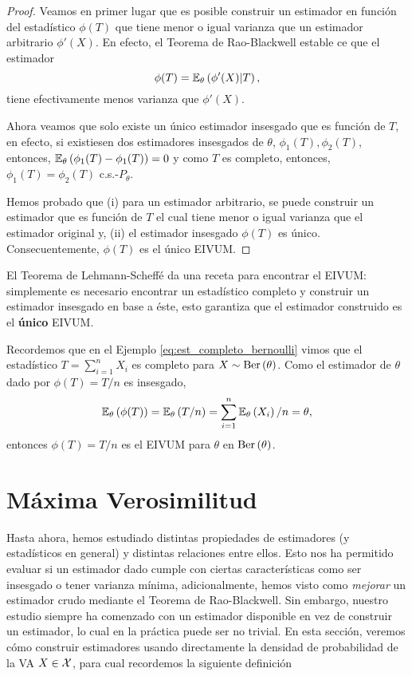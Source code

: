  \begin{proof}
 	Veamos en primer lugar que es posible construir un estimador en función del estadístico $\phi(T)$ que tiene menor o igual varianza que un estimador arbitrario $\phi'(X)$. En efecto, el Teorema de Rao-Blackwell estable ce que el estimador 
 	\begin{equation}
 		\phi(T) = \mathbb{E}_\theta \left(\phi'(X)|T\right),
 	\end{equation}
 	tiene efectivamente menos varianza que $\phi'(X)$.

 	Ahora veamos que solo existe un único estimador insesgado que es función de $T$, en efecto, si existiesen dos estimadores insesgados de $\theta$, $\phi_1(T),\phi_2(T)$, entonces, $\mathbb{E}_\theta \left(\phi_1(T)-\phi_1(T)\right)=0$ y como $T$ es completo, entonces, $\phi_1(T) = \phi_2(T)$ c.s.-$P_\theta$.

 	Hemos probado que (i) para un estimador arbitrario, se puede construir un estimador que es función de $T$ el cual tiene menor o igual varianza que el estimador original y, (ii) el estimador insesgado $\phi(T)$ es único. Consecuentemente, $\phi(T)$ es el único EIVUM.
 \end{proof}

El Teorema de Lehmann-Scheffé da una receta para encontrar el EIVUM: simplemente es necesario encontrar un estadístico completo y construir un estimador insesgado en base a éste, esto garantiza que el estimador construido es el \textbf{único} EIVUM.
\begin{example}
	Recordemos que en el Ejemplo \ref{eq:est_completo_bernoulli} vimos que el estadístico $T=\sum_{i=1}^nX_i$ es completo para $X\sim\text{Ber}\left(\theta\right)$. Como el estimador de $\theta$ dado por $\phi(T) = T/n$ es insesgado, 
\begin{equation}
	\mathbb{E}_\theta \left(\phi(T)\right) = \mathbb{E}_\theta \left(T/n\right) = \sum_{i=1}^n \mathbb{E}_\theta \left(X_i\right) /n = \theta,
\end{equation}
entonces $\phi(T) = T/n$ es el EIVUM para $\theta$ en $\text{Ber}\left(\theta\right)$.	
\end{example}


\section{Máxima Verosimilitud} %
\label{sec:estimador_de_máxima_verosimilitud}
Hasta ahora, hemos estudiado distintas propiedades de estimadores (y estadísticos en general) y distintas relaciones entre ellos. Esto nos ha permitido evaluar si un estimador dado cumple con ciertas características como ser insesgado o tener varianza mínima, adicionalmente, hemos visto como \textit{mejorar} un estimador crudo mediante el Teorema de Rao-Blackwell. Sin embargo, nuestro estudio siempre ha comenzado con un estimador disponible en vez de construir un estimador, lo cual en la práctica puede ser no trivial. En esta sección, veremos cómo construir estimadores usando directamente la densidad de probabilidad de la VA $X\in{\mathcal X}$, para cual recordemos la siguiente definición

